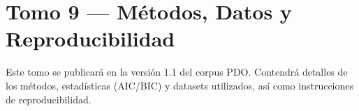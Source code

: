 \documentclass{article}
\begin{document}
\section*{Tomo 9 — Métodos, Datos y Reproducibilidad}
Este tomo se publicará en la versión 1.1 del corpus PDO. Contendrá detalles de los métodos, estadísticas (AIC/BIC) y datasets utilizados, así como instrucciones de reproducibilidad.
\end{document}
